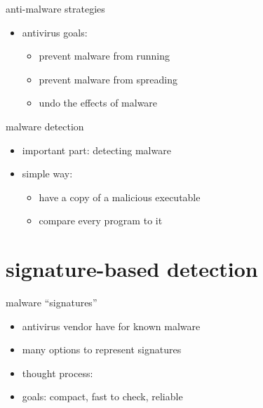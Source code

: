 \begin{frame}{anti-malware strategies}
    \begin{itemize}
    \item antivirus goals:
    \begin{itemize}
    \item prevent malware from running
    \item prevent malware from spreading
    \item undo the effects of malware
    \end{itemize}
    \end{itemize}
\end{frame}

\begin{frame}{malware detection}
    \begin{itemize}
    \item important part: detecting malware
    \item simple way:
        \begin{itemize}
        \item have a copy of a malicious executable
        \item compare every program to it
        \end{itemize}
    \end{itemize}
\end{frame}

\section{signature-based detection}

\begin{frame}{malware ``signatures''}
    \begin{itemize}
    \item antivirus vendor have  for known malware
    \item many options to represent signatures
    \item thought process: 
    \vspace{.5cm}
    \item goals: compact, fast to check, reliable
    \end{itemize}
\end{frame}

